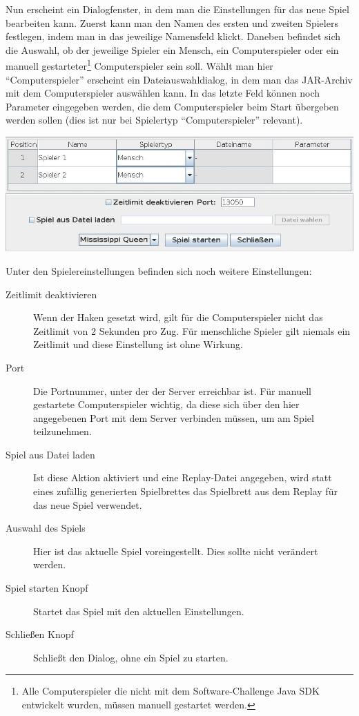 \documentclass[12pt,a4paper, ngerman, oneside]{scrartcl}
\begin{document}
Nun erscheint ein Dialogfenster, in dem man die Einstellungen für das neue Spiel
bearbeiten kann. Zuerst kann man den Namen des ersten und zweiten Spielers
festlegen, indem man in das jeweilige Namensfeld klickt. Daneben befindet sich
die Auswahl, ob der jeweilige Spieler ein Mensch, ein Computerspieler oder ein
manuell gestarteter\footnote{Alle Computerspieler die nicht mit dem
  Software-Challenge Java SDK entwickelt wurden, müssen manuell gestartet
  werden.} Computerspieler sein soll. Wählt man hier ``Computerspieler''
erscheint ein Dateiauswahldialog, in dem man das JAR-Archiv mit dem
Computerspieler auswählen kann. In das letzte Feld können noch Parameter
eingegeben werden, die dem Computerspieler beim Start übergeben werden sollen
(dies ist nur bei Spielertyp ``Computerspieler'' relevant).

\begin{centering}
  \includegraphics[width=\textwidth]{bilder/neues-spiel-dialog.jpg}
\end{centering}

Unter den Spielereinstellungen befinden sich noch weitere Einstellungen:

\begin{description}
\item [Zeitlimit deaktivieren] Wenn der Haken gesetzt wird, gilt für die Computerspieler nicht das Zeitlimit von 2 Sekunden pro Zug. Für menschliche Spieler gilt niemals ein Zeitlimit und diese Einstellung ist ohne Wirkung.
\item [Port] Die Portnummer, unter der der Server erreichbar ist. Für manuell gestartete Computerspieler wichtig, da diese sich über den hier angegebenen Port mit dem Server verbinden müssen, um am Spiel teilzunehmen.
\item [Spiel aus Datei laden] Ist diese Aktion aktiviert und eine Replay-Datei angegeben, wird statt eines zufällig generierten Spielbrettes das Spielbrett aus dem Replay für das neue Spiel verwendet.
\item [Auswahl des Spiels] Hier ist das aktuelle Spiel voreingestellt. Dies sollte nicht verändert werden.
\item [Spiel starten Knopf] Startet das Spiel mit den aktuellen Einstellungen.
\item [Schließen Knopf] Schließt den Dialog, ohne ein Spiel zu starten.
\end{description}
\end{document}
